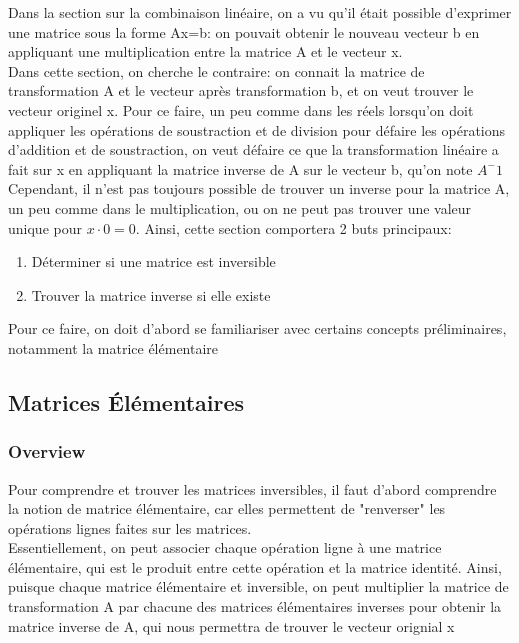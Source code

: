 \documentclass{article}
\begin{document}
Dans la section sur la combinaison linéaire, on a vu qu'il était possible
d'exprimer une matrice sous la forme Ax=b: on pouvait obtenir le nouveau
vecteur b en appliquant une multiplication entre la matrice A et le vecteur x.\\

Dans cette section, on cherche le contraire: on connait la matrice de
transformation A et le vecteur après transformation b, et on veut trouver le
vecteur originel x. Pour ce faire, un peu comme dans les réels lorsqu'on
doit appliquer les opérations de soustraction et de division pour défaire
les opérations d'addition et de soustraction, on veut défaire ce que la
transformation linéaire a fait sur x en appliquant la matrice inverse de A sur
le vecteur b, qu'on note $A^-1$\\

Cependant, il n'est pas toujours possible de trouver un inverse pour la matrice
A, un peu comme dans le multiplication, ou on ne peut pas trouver une valeur
unique pour $ x \cdot 0 = 0 $. Ainsi, cette section comportera 2 buts
principaux:
\begin{enumerate}
    \item Déterminer si une matrice est inversible
    \item Trouver la matrice inverse si elle existe
\end{enumerate}

Pour ce faire, on doit d'abord se familiariser avec certains concepts
préliminaires, notamment la matrice élémentaire

\subsection{Matrices Élémentaires}%
\label{sub:Matrices Élémentaires}

\subsubsection{Overview}%
\label{ssub:Overview}

Pour comprendre et trouver les matrices inversibles, il faut d'abord comprendre
la notion de matrice élémentaire, car elles permettent de "renverser" les
opérations lignes faites sur les matrices.\\

Essentiellement, on peut associer chaque opération ligne à une matrice
élémentaire, qui est le produit entre cette opération et la matrice identité.
Ainsi, puisque chaque matrice élémentaire et inversible, on peut multiplier
la matrice de transformation A par chacune des matrices élémentaires inverses
pour obtenir la matrice inverse de A, qui nous permettra de trouver le
vecteur orignial x
\end{document}
